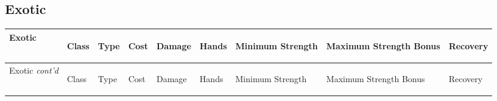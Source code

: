 \documentclass[twoside]{book}
\begin{document}
    

\subsection{Exotic}
    
\begin{longtable}{p{1.25in}llllp{2em}p{3em}p{3em}l} 
  Exotic& \begin{turn}{70}{Class}\end{turn}
          & \begin{turn}{70}{Type}\end{turn}
          & \begin{turn}{70}{Cost}\end{turn}
          & \begin{turn}{70}{Damage}\end{turn}
          & \begin{turn}{70}{Hands}\end{turn}
          & \begin{turn}{70}{Minimum Strength}\end{turn}
          & \begin{turn}{70}{Maximum Strength Bonus}\end{turn}
          & \begin{turn}{70}{Recovery}\end{turn}
          \\
  \hline
  \hline
  \endfirsthead
  Exotic \textit{cont'd}
        & \begin{turn}{70}{Class}\end{turn}
          & \begin{turn}{70}{Type}\end{turn}
          & \begin{turn}{70}{Cost}\end{turn}
          & \begin{turn}{70}{Damage}\end{turn}
          & \begin{turn}{70}{Hands}\end{turn}
          & \begin{turn}{70}{Minimum Strength}\end{turn}
          & \begin{turn}{70}{Maximum Strength Bonus}\end{turn}
          & \begin{turn}{70}{Recovery}\end{turn}
           \\

\end{longtable}
\end{document}
